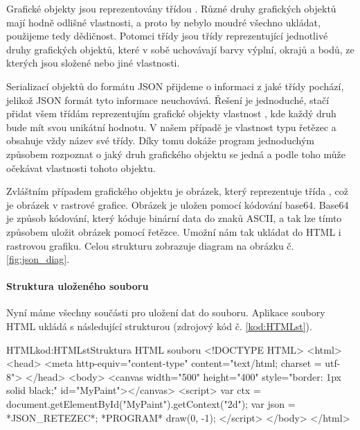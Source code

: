 \documentclass[
  field=inf,
  biblatex,
  glossaries,
  index
]{kidiplom}
\begin{document}
Grafické objekty jsou reprezentovány třídou . Různé druhy grafických objektů mají hodně odlišné vlastnosti, a proto by nebylo moudré všechno ukládat, použijeme tedy dědičnost. Potomci třídy  jsou třídy reprezentující jednotlivé druhy grafických objektů, které v sobě uchovávají barvy výplní, okrajů a bodů, ze kterých jsou složené nebo jiné vlastnosti.

Serializací objektů do formátu JSON přijdeme o informaci z jaké třídy pochází, jelikož JSON formát tyto informace neuchovává. Řešení je jednoduché, stačí přidat všem třídám reprezentujím grafické objekty vlastnost , kde každý druh bude mít svou unikátní hodnotu. V našem případě je vlastnost  typu řetězec a obsahuje vždy název své třídy. Díky tomu dokáže program jednoduchým způsobem rozpoznat o jaký druh grafického objektu se jedná a podle toho může očekávat vlastnosti tohoto objektu.

Zvláštním případem grafického objektu je obrázek, který reprezentuje třída , což je obrázek v rastrové grafice. Obrázek je uložen pomocí kódování base64. Base64 je způsob kódování, který kóduje binární data do znaků ASCII, a tak lze tímto způsobem uložit obrázek pomocí řetězce. Umožní nám tak ukládat do HTML i rastrovou grafiku. Celou strukturu zobrazuje diagram na obrázku č. \ref{fig:json_diag}.

\paragraph{Struktura uloženého souboru}
Nyní máme všechny součásti pro uložení dat do souboru. Aplikace soubory HTML ukládá s následující strukturou (zdrojový kód č. \ref{kod:HTMLst}).

\begin{kicode}{HTML}{kod:HTMLst}{Struktura HTML souboru}
<!DOCTYPE HTML>
<html>
  <head>
    <meta http-equiv="content-type" content="text/html; charset = utf-8">
  </head>
  <body>
  <canvas width="500" height="400" style="border: 1px solid black;" id="MyPaint"></canvas>
  <script>
    var ctx = document.getElementById("MyPaint").getContext("2d");
    var json = *JSON_RETEZEC*;
    *PROGRAM*
    draw(0, -1);
  </script>
  </body>
</html>
\end{kicode}
\end{document}
